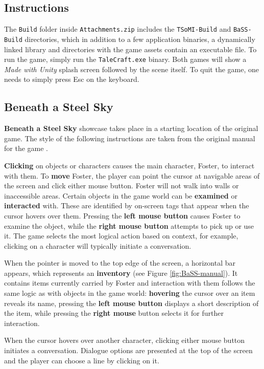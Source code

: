 \subsection{Instructions}
The \verb|Build| folder inside \verb|Attachments.zip| includes the \verb|TSoMI-Build| and \verb|BaSS-Build| directories, which in addition to a few application binaries, a dynamically linked library and directories with the game assets contain an executable file. To run the game, simply run the \verb|TaleCraft.exe| binary. Both games will show a \textit{Made with Unity }splash screen followed by the scene itself. To quit the game, one needs to simply press Esc on the keyboard.

\subsection{Beneath a Steel Sky}
\textbf{Beneath a Steel Sky} showcase takes place in a starting location of the original game. The style of the following instructions are taken from the original manual for the game \cite{BaSS-Manual}.

\textbf{Clicking} on objects or characters causes the main character, Foster, to interact with them. To \textbf{move} Foster, the player can point the cursor at navigable areas of the screen and click either mouse button. Foster will not walk into walls or inaccessible areas. Certain objects in the game world can be \textbf{examined} or \textbf{interacted} with. These are identified by on-screen tags that appear when the cursor hovers over them. Pressing the \textbf{left mouse button} causes Foster to examine the object, while the \textbf{right mouse button} attempts to pick up or use it. The game selects the most logical action based on context, for example, clicking on a character will typically initiate a conversation. 

When the pointer is moved to the top edge of the screen, a horizontal bar appears, which represents an \textbf{inventory} (see Figure \ref{fig:BaSS-manual}). It contains items currently carried by Foster and interaction with them follows the same logic as with objects in the game world: \textbf{hovering} the cursor over an item reveals its name, pressing the \textbf{left mouse button} displays a short description of the item, while pressing the \textbf{right mouse} button selects it for further interaction. 

When the cursor hovers over another character, clicking either mouse button initiates a conversation. Dialogue options are presented at the top of the screen and the player can choose a line by clicking on it. 

